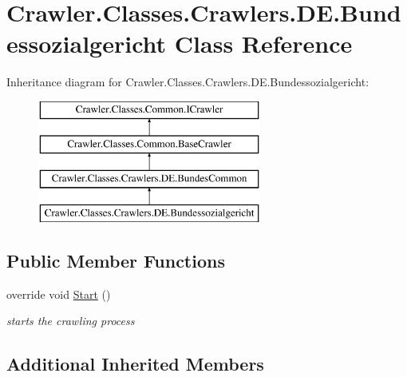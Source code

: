 \hypertarget{class_crawler_1_1_classes_1_1_crawlers_1_1_d_e_1_1_bundessozialgericht}{\section{Crawler.\-Classes.\-Crawlers.\-D\-E.\-Bundessozialgericht Class Reference}
\label{class_crawler_1_1_classes_1_1_crawlers_1_1_d_e_1_1_bundessozialgericht}
}
Inheritance diagram for Crawler.\-Classes.\-Crawlers.\-D\-E.\-Bundessozialgericht\-:\begin{figure}[H]
\begin{center}
\leavevmode
\includegraphics[height=4.000000cm]{class_crawler_1_1_classes_1_1_crawlers_1_1_d_e_1_1_bundessozialgericht}
\end{center}
\end{figure}
\subsection*{Public Member Functions}
\begin{DoxyCompactItemize}
\item 
override void \hyperlink{class_crawler_1_1_classes_1_1_crawlers_1_1_d_e_1_1_bundessozialgericht_a629080a4171a5b06a46b05cfc8296d95}{Start} ()
\begin{DoxyCompactList}\small\item\em starts the crawling process \end{DoxyCompactList}\end{DoxyCompactItemize}
\subsection*{Additional Inherited Members}


